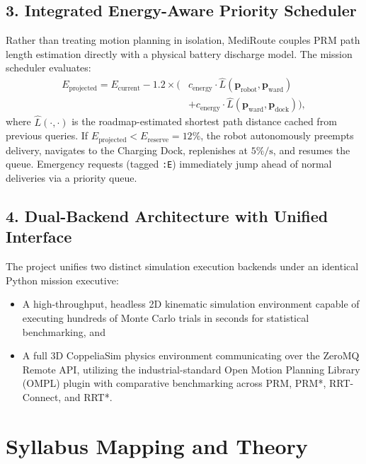 \documentclass[12pt,a4paper]{article}
\begin{document}
\subsection{3. Integrated Energy-Aware Priority Scheduler}
Rather than treating motion planning in isolation, MediRoute couples PRM path length estimation directly with a physical battery discharge model. The mission scheduler evaluates:
\begin{equation}
\begin{split}
E_{\text{projected}} = E_{\text{current}} - 1.2 \times \Big( & c_{\text{energy}} \cdot \hat{L}(\mathbf{p}_{\text{robot}}, \mathbf{p}_{\text{ward}}) \\
& + c_{\text{energy}} \cdot \hat{L}(\mathbf{p}_{\text{ward}}, \mathbf{p}_{\text{dock}}) \Big),
\end{split}
\end{equation}
where $\hat{L}(\cdot, \cdot)$ is the roadmap-estimated shortest path distance cached from previous queries. If $E_{\text{projected}} < E_{\text{reserve}} = 12\%$, the robot autonomously preempts delivery, navigates to the Charging Dock, replenishes at $5\%/\text{s}$, and resumes the queue. Emergency requests (tagged \texttt{:E}) immediately jump ahead of normal deliveries via a priority queue.

\subsection{4. Dual-Backend Architecture with Unified Interface}
The project unifies two distinct simulation execution backends under an identical Python mission executive:
\begin{itemize}[itemsep=1pt,topsep=1pt]
\item A high-throughput, headless 2D kinematic simulation environment capable of executing hundreds of Monte Carlo trials in seconds for statistical benchmarking, and
\item A full 3D CoppeliaSim physics environment communicating over the ZeroMQ Remote API, utilizing the industrial-standard Open Motion Planning Library (OMPL) plugin with comparative benchmarking across PRM, PRM*, RRT-Connect, and RRT*.
\end{itemize}

\section{Syllabus Mapping and Theory}
\end{document}

